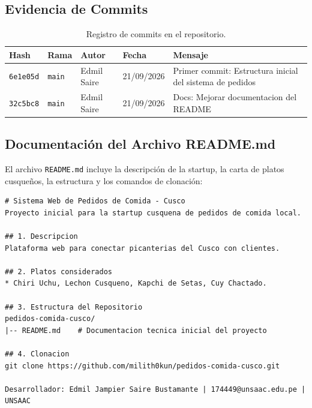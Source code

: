 \documentclass[11pt,a4paper]{article}
\begin{document}
\subsection{Evidencia de Commits}
\begin{table}[H]
    \centering
    \begin{tabular}{@{}llllp{7cm}@{}}
        \toprule
        \textbf{Hash} & \textbf{Rama} & \textbf{Autor} & \textbf{Fecha} & \textbf{Mensaje} \\
        \midrule
        \texttt{6e1e05d} & \texttt{main} & Edmil Saire & 21/09/2026 & Primer commit: Estructura inicial del sistema de pedidos \\
        \texttt{32c5bc8} & \texttt{main} & Edmil Saire & 21/09/2026 & Docs: Mejorar documentacion del README \\
        \bottomrule
    \end{tabular}
    \caption{Registro de commits en el repositorio.}
\end{table}

\subsection{Documentación del Archivo README.md}
El archivo \texttt{README.md} incluye la descripción de la startup, la carta de platos cusqueños, la estructura y los comandos de clonación:
\begin{tcolorbox}[colback=codebg, colframe=unsaacblue!40, title=\textbf{Contenido del README.md}]
\small
\begin{verbatim}
# Sistema Web de Pedidos de Comida - Cusco
Proyecto inicial para la startup cusquena de pedidos de comida local.

## 1. Descripcion
Plataforma web para conectar picanterias del Cusco con clientes.

## 2. Platos considerados
* Chiri Uchu, Lechon Cusqueno, Kapchi de Setas, Cuy Chactado.

## 3. Estructura del Repositorio
pedidos-comida-cusco/
|-- README.md    # Documentacion tecnica inicial del proyecto

## 4. Clonacion
git clone https://github.com/milith0kun/pedidos-comida-cusco.git

Desarrollador: Edmil Jampier Saire Bustamante | 174449@unsaac.edu.pe | UNSAAC
\end{verbatim}
\end{tcolorbox}

\end{document}
